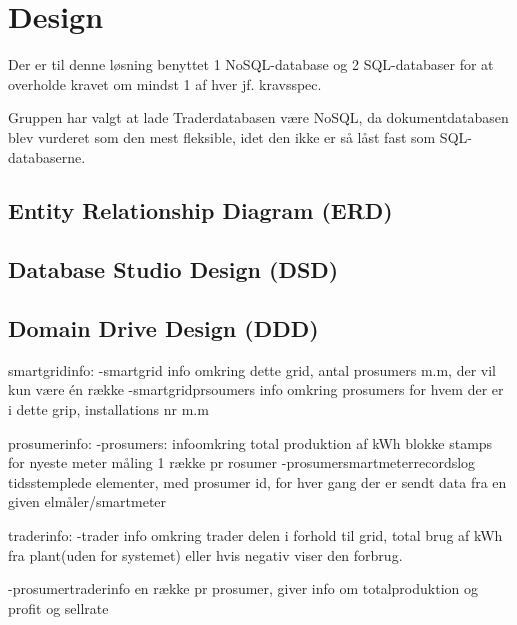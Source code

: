
\section{Design}

Der er til denne løsning benyttet 1 NoSQL-database og 2 SQL-databaser for at overholde kravet om mindst 1 af hver jf. kravsspec.

Gruppen har valgt at lade Traderdatabasen være NoSQL, da dokumentdatabasen blev vurderet som den mest fleksible, idet den ikke er så låst fast som SQL-databaserne.

\subsection{Entity Relationship Diagram (ERD)}

\subsection{Database Studio Design (DSD)}

\subsection{Domain Drive Design (DDD)}





smartgridinfo:
-smartgrid
    info omkring dette grid, antal prosumers m.m, der vil kun være én række
-smartgridprsoumers
    info omkring prosumers for hvem der er i dette grip, installations nr m.m

prosumerinfo:
-prosumers:
    infoomkring total produktion af kWh blokke
    stamps for nyeste meter måling 1 række pr rosumer
-prosumersmartmeterrecordslog
    tidsstemplede elementer, med prosumer id, for hver gang der er sendt data fra en given elmåler/smartmeter


traderinfo:
-trader
    info omkring trader delen i forhold til grid, total brug af kWh fra plant(uden for systemet) eller hvis negativ viser den forbrug. 

-prosumertraderinfo
    en række pr prosumer, giver info om totalproduktion og profit og sellrate

